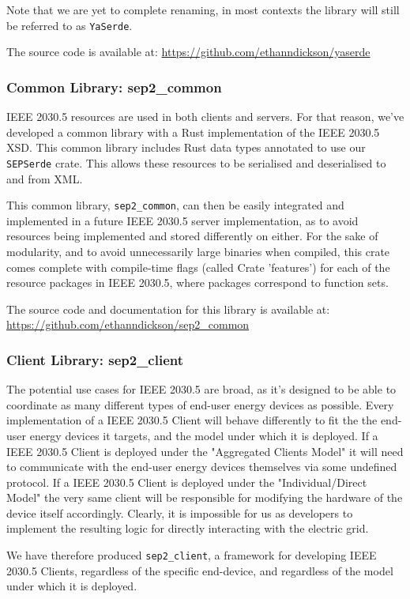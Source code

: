 Note that we are yet to complete renaming, in most contexts the library will still be referred to as \texttt{YaSerde}.

The source code is available at: \url{https://github.com/ethanndickson/yaserde}

\subsubsection{Common Library: \- sep2\_common}
IEEE 2030.5 resources are used in both clients and servers. For that reason, we've developed a common library with a Rust implementation of the IEEE 2030.5 XSD. This common library includes Rust data types annotated to use our \texttt{SEPSerde} crate. This allows these resources to be serialised and deserialised to and from XML.

This common library, \texttt{sep2\_common}, can then be easily integrated and implemented in a future IEEE 2030.5 server implementation, as to avoid resources being implemented and stored differently on either. 
For the sake of modularity, and to avoid unnecessarily large binaries when compiled, this crate comes complete with compile-time flags (called Crate 'features') for each of the resource packages in IEEE 2030.5, where packages correspond to function sets.

The source code and documentation for this library is available at: \url{https://github.com/ethanndickson/sep2_common}

\subsubsection{Client Library: \- sep2\_client}
The potential use cases for IEEE 2030.5 are broad, as it's designed to be able to coordinate as many different types of end-user energy devices as possible.
Every implementation of a IEEE 2030.5 Client will behave differently to fit the the end-user energy devices it targets, and the model under which it is deployed. 
If a IEEE 2030.5 Client is deployed under the "Aggregated Clients Model" it will need to communicate with the end-user energy devices themselves via some undefined protocol.
If a IEEE 2030.5 Client is deployed under the "Individual/Direct Model" the very same client will be responsible for modifying the hardware of the device itself accordingly. 
Clearly, it is impossible for us as developers to implement the resulting logic for directly interacting with the electric grid.

We have therefore produced \texttt{sep2\_client}, a framework for developing IEEE 2030.5 Clients, regardless of the specific end-device, and regardless of the model under which it is deployed.

